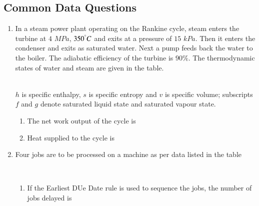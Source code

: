 \documentclass[journal,12pt,onecolumn]{IEEEtran}
\theoremstyle{remark}
\begin{document}
\subsection*{Common Data Questions}
\begin{enumerate}

\item In a steam power plant operating on the Rankine cycle, steam enters the turbine at $4$ $MPa$, $350^\degree C$ and exits at a pressure of $15$ $kPa$. Then it enters the condenser and exits as saturated water. Next a pump feeds back the water to the boiler. The adiabatic efficiency of the turbine is $90\%$. The thermodynamic states of water and steam are given in the table.
\begin{table}[h!]    
  \centering
  
\end{table}\\
$h$ is specific enthalpy, $s$ is specific entropy and $v$ is specific volume; subscripts $f$ and $g$ denote saturated liquid state and saturated vapour state.
\begin{enumerate}
\item The net work output  of the cycle is
\hfill{}
\begin{enumerate}[label=(\alph*)]
\end{enumerate}

\item Heat supplied  to the cycle is

\hfill{}
\begin{enumerate}[label=(\alph*)]
\end{enumerate}
\end{enumerate}

\item Four jobs are to be processed on a machine as per data listed in the table
\\\begin{table}[h!]    
  \centering
  
\end{table}\\
\begin{enumerate}
\item If the Earliest DUe Date  rule is used to sequence the jobs, the number of jobs delayed is


\end{enumerate}
\end{enumerate}
\end{document}
